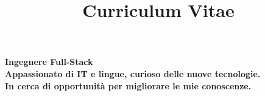 \documentclass[a4paper,skipsamekey,11pt,italian]{curve}
\title{Curriculum Vitae}
\begin{document}
\makeheaders[c]

\textbf{Ingegnere Full-Stack \\}
\textbf{Appassionato di IT e lingue, curioso delle nuove tecnologie. \\ In cerca di opportunità per migliorare le mie conoscenze.}
\end{document}
